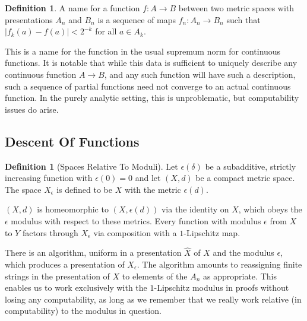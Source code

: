 \documentclass[10pt,a4paper]{article}
\theoremstyle{definition}
\newtheorem{dfn}[thm]{Definition}
\begin{document}
\begin{dfn}
    A name for a function $f:A\rightarrow B$ between two metric spaces with presentations $A_n$ and $B_n$ is a sequence of maps $f_n:A_n\rightarrow B_n$ such that $|f_k(a) -f(a)| < 2^{-k}$ for all $a \in A_k$.
\end{dfn}
\label{dfn:funcname}

This is a name for the function in the usual supremum norm for continuous functions. It is notable that while this data is sufficient to uniquely describe any continuous function $A\rightarrow B$, and any such function will have such a description, such a sequence of partial functions need not converge to an actual continuous function. In the purely analytic setting, this is unproblematic, but computability issues do arise.

\subsection{Descent Of Functions}
\label{sec:descent}
\begin{dfn}[Spaces Relative To Moduli]
Let $\epsilon(\delta)$ be a subadditive, strictly increasing function with $\epsilon(0) = 0$ and let $(X,d)$ be a compact metric space. The space $X_\epsilon$ is defined to be $X$ with the metric $\epsilon(d)$. 
\end{dfn}
\label{dfn:relativespaces}

$(X,d)$ is homeomorphic to $(X,\epsilon(d))$ via the identity on $X$, which obeys the $\epsilon$ modulus with respect to these metrics. Every function with modulus $\epsilon$ from $X$ to $Y$ factors through $X_\epsilon$ via composition with a $1$-Lipschitz map.

There is an algorithm, uniform in a presentation $\hat{X}$ of $X$ and the modulus $\epsilon$, which produces a presentation of $X_\epsilon$. The algorithm amounts to reassigning finite strings in the presentation of $X$ to elements of the $A_n$ as appropriate. This enables us to work exclusively with the $1$-Lipschitz modulus in proofs without losing any computability, as long as we remember that we really work relative (in computability) to the modulus in question.
\end{document}
